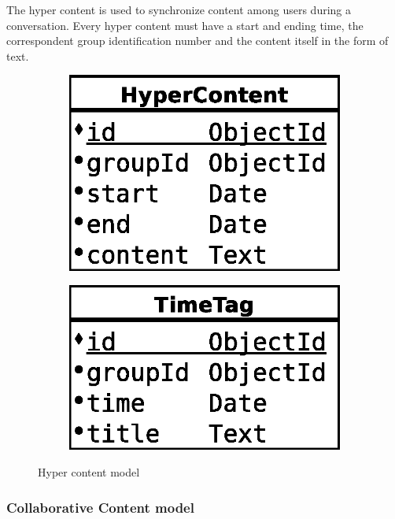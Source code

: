 The hyper content is used to synchronize content among users during a conversation. Every hyper content must have a start and ending time, the correspondent group identification number and the content itself in the form of text.

\begin{figure}[H]
    \centering
    \begin{subfigure}[b]{0.25\textwidth}
    	\includegraphics[width=\textwidth]{figures/model_hyper_content}
    \end{subfigure}
    \begin{subfigure}[b]{0.25\textwidth}
    	\includegraphics[width=\textwidth]{figures/model_time_tag}
    \end{subfigure}    
    \caption{Hyper content model}
\end{figure} 

\subsubsection{Collaborative Content model}

